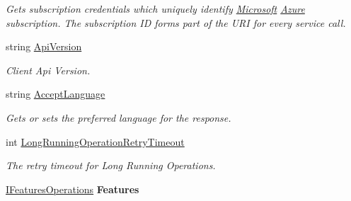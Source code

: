 \begin{DoxyCompactItemize}
\begin{DoxyCompactList}\small\item\em Gets subscription credentials which uniquely identify \hyperlink{namespace_microsoft}{Microsoft} \hyperlink{namespace_microsoft_1_1_azure}{Azure} subscription. The subscription ID forms part of the U\+RI for every service call. \end{DoxyCompactList}\item 
string \hyperlink{interface_microsoft_1_1_azure_1_1_management_1_1_resources_1_1_i_feature_client_acec2db4cc82d4ed9b62742987e939b7d}{Api\+Version}
\begin{DoxyCompactList}\small\item\em Client Api Version. \end{DoxyCompactList}\item 
string \hyperlink{interface_microsoft_1_1_azure_1_1_management_1_1_resources_1_1_i_feature_client_a7c42e3ad984a1575d7437680b296a7e0}{Accept\+Language}
\begin{DoxyCompactList}\small\item\em Gets or sets the preferred language for the response. \end{DoxyCompactList}\item 
int \hyperlink{interface_microsoft_1_1_azure_1_1_management_1_1_resources_1_1_i_feature_client_a9839526a6e3654470308e03412425451}{Long\+Running\+Operation\+Retry\+Timeout}
\begin{DoxyCompactList}\small\item\em The retry timeout for Long Running Operations. \end{DoxyCompactList}\item 
\hyperlink{interface_microsoft_1_1_azure_1_1_management_1_1_resources_1_1_i_features_operations}{I\+Features\+Operations} {\bfseries Features}\hypertarget{interface_microsoft_1_1_azure_1_1_management_1_1_resources_1_1_i_feature_client_a9b5dc95ff867b589a4a32a03699dfb8e}{}\label{interface_microsoft_1_1_azure_1_1_management_1_1_resources_1_1_i_feature_client_a9b5dc95ff867b589a4a32a03699dfb8e}

\end{DoxyCompactItemize}


